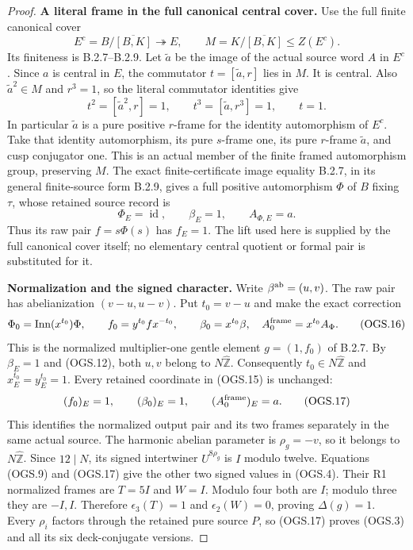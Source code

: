 \begin{proof}
\par\medskip\noindent\textbf{A literal frame in the full canonical central cover.}\quad
Use the full finite canonical cover
\[
 E^c=B/\overline{[B,K]}\twoheadrightarrow E,\qquad
 M=K/\overline{[B,K]}\leq Z(E^c).
                                                               \tag{OGS.13}
\]
Its finiteness is B.2.7--B.2.9.
Let $\widetilde a$ be the image of the actual source
word $A$ in $E^c$.
Since $a$ is central in $E$, the commutator
$t=[\widetilde a,r]$ lies in $M$.
It is central.  Also $\widetilde a^2\in M$ and
$r^3=1$, so the literal commutator identities give
\[
       t^2=[\widetilde a^2,r]=1,\qquad
       t^3=[\widetilde a,r^3]=1,\qquad t=1.
                                                               \tag{OGS.14}
\]
In particular $\widetilde a$ is a pure positive
$r$-frame for the identity automorphism of $E^c$.
Take that identity automorphism, its pure $s$-frame
one, its pure $r$-frame $\widetilde a$, and cusp
conjugator one.
This is an actual member of the finite framed
automorphism group, preserving $M$.
The exact finite-certificate image equality
B.2.7, in its general finite-source form B.2.9,
gives a full positive automorphism $\Phi$ of $B$
fixing $\tau$, whose retained source record is
\[
        \Phi_E=\operatorname{id},\qquad
        \beta_E=1,\qquad A_{\Phi,E}=a .
                                                               \tag{OGS.15}
\]
Thus its raw pair $f=s\Phi(s)$ has $f_E=1$.
The lift used here is supplied by the full canonical
cover itself; no elementary central quotient or
formal pair is substituted for it.

\par\medskip\noindent\textbf{Normalization and the signed character.}\quad
Write $\beta^{\rm ab}=(u,v)$.
The raw pair has abelianization $(v-u,u-v)$.
Put $t_0=v-u$ and make the exact correction
\[
 \Phi_0=\operatorname{Inn}(x^{t_0})\Phi,\qquad
 f_0=y^{t_0}fx^{-t_0},\qquad
 \beta_0=x^{t_0}\beta,\quad A_0^{\rm frame}=x^{t_0}A_\Phi .
                                                               \tag{OGS.16}
\]
This is the normalized multiplier-one gentle element
$g=(1,f_0)$ of B.2.7.
By $\beta_E=1$ and (OGS.12), both $u,v$ belong
to $N\widehat{\mathbb Z}$.
Consequently $t_0\in N\widehat{\mathbb Z}$ and
$x_E^{t_0}=y_E^{t_0}=1$.
Every retained coordinate in (OGS.15) is unchanged:
\[
             (f_0)_E=1,\qquad(\beta_0)_E=1,\qquad
                          (A_0^{\rm frame})_E=a .
                                                               \tag{OGS.17}
\]
This identifies the normalized output pair and its
two frames separately in the same actual source.
The harmonic abelian parameter is $\rho_g=-v$,
so it belongs to $N\widehat{\mathbb Z}$.
Since $12\mid N$, its signed intertwiner
$U^{8\rho_g}$ is $I$ modulo twelve.
Equations (OGS.9) and (OGS.17) give the other
two signed values in (OGS.4).
Their R1 normalized frames are $T=5I$ and $W=I$.
Modulo four both are $I$; modulo three they are
$-I,I$.  Therefore $\epsilon_3(T)=1$ and
$\epsilon_2(W)=0$, proving $\Delta(g)=1$.
Every $\rho_i$ factors through the retained pure
source $P$, so (OGS.17) proves (OGS.3) and all
its six deck-conjugate versions.


\end{proof}
